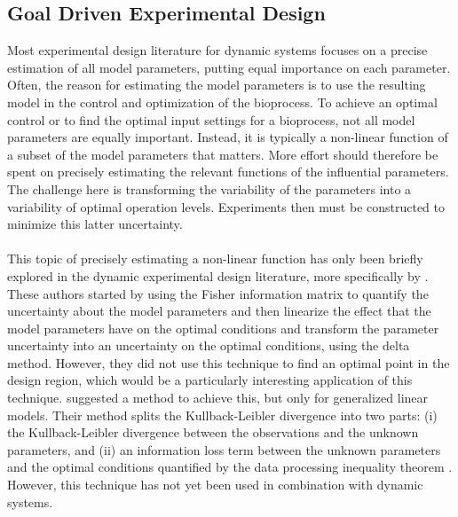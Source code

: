 \subsection{Goal Driven Experimental Design}
Most experimental design literature for dynamic systems focuses on a precise estimation of all model parameters, putting equal importance on each parameter. Often, the reason for estimating the model parameters is to use the resulting model in the control and optimization of the bioprocess. To achieve an optimal control or to find the optimal input settings for a bioprocess, not all model parameters are equally important. Instead, it is typically a non-linear function of a subset of the model parameters that matters. More effort should therefore be spent on precisely estimating the relevant functions of the influential parameters. The challenge here is transforming the variability of the parameters into a variability of optimal operation levels. Experiments then must be constructed to minimize this latter uncertainty.
\\
\\
This topic of precisely estimating a non-linear function has only been briefly explored in the dynamic experimental design literature, more specifically by \textcite{houska}. These authors started by using the Fisher information matrix to quantify the uncertainty about the model parameters and then linearize the effect that the model parameters have on the optimal conditions and transform the parameter uncertainty into an uncertainty on the optimal conditions, using the delta method. However, they did not use this technique to find an optimal point in the design region, which would be a particularly interesting application of this technique. \textcite{li} suggested a method to achieve this, but only for generalized linear models. Their method splits the Kullback-Leibler divergence into two parts: (i) the Kullback-Leibler divergence between the observations and the unknown parameters, and (ii) an information loss term between the unknown parameters and the optimal conditions quantified by the data processing inequality theorem \parencite{cover}. However, this technique has not yet been used in combination with dynamic systems.
